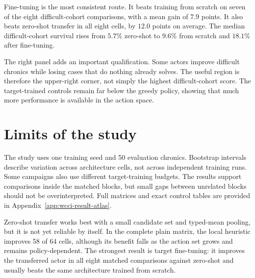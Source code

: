 Fine-tuning is the most consistent route. It beats training from scratch on
seven of the eight difficult-cohort comparisons, with a mean gain of $7.9$
points. It also beats zero-shot transfer in all eight cells, by $12.0$ points on
average. The median difficult-cohort survival rises from $5.7\%$ zero-shot to
$9.6\%$ from scratch and $18.1\%$ after fine-tuning.

The right panel adds an important qualification. Some actors improve difficult
chronics while losing cases that do nothing already solves. The useful region
is therefore the upper-right corner, not simply the highest difficult-cohort
score. The target-trained controls remain far below the greedy policy, showing
that much more performance is available in the action space.

\section{Limits of the study}

The study uses one training seed and 50 evaluation chronics. Bootstrap intervals
describe variation across architecture cells, not across independent training
runs. Some campaigns also use different target-training budgets. The results
support comparisons inside the matched blocks, but small gaps between unrelated
blocks should not be overinterpreted. Full matrices and exact control tables are
provided in Appendix~\ref{app:wcci-result-atlas}.

\begin{tcolorbox}[
  colframe=red!75!black,
  colback=red!5!white,
  title=Chapter 9 Summary]
Zero-shot transfer works best with a small candidate set and typed-mean pooling,
but it is not yet reliable by itself. In the complete plain matrix, the local
heuristic improves 58 of 64 cells, although its benefit falls as the action set
grows and remains policy-dependent. The strongest result is target fine-tuning:
it improves the transferred actor in all eight matched comparisons against
zero-shot and usually beats the same architecture trained from scratch.
\end{tcolorbox}
